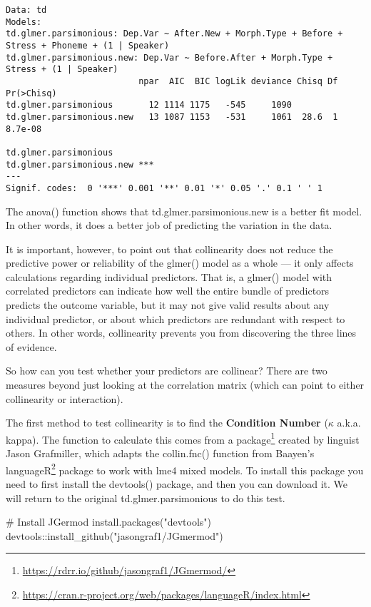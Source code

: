 \documentclass[
  10pt,
  letterpaper]{article}
\newenvironment{Shaded}{\begin{snugshade}}{\end{snugshade}}
\newcommand{\CommentTok}[1]{\textcolor[rgb]{0.37,0.37,0.37}{#1}}
\newcommand{\FunctionTok}[1]{\textcolor[rgb]{0.28,0.35,0.67}{#1}}
\newcommand{\NormalTok}[1]{\textcolor[rgb]{0.00,0.23,0.31}{#1}}
\newcommand{\SpecialCharTok}[1]{\textcolor[rgb]{0.37,0.37,0.37}{#1}}
\newcommand{\StringTok}[1]{\textcolor[rgb]{0.13,0.47,0.30}{#1}}
\renewcommand\texttt[1]{{\ttfamily\color{BrickRed}#1}}
\DeclareRobustCommand{\href}[2]{#2\footnote{\url{#1}}}
\begin{document}
\begin{verbatim}
Data: td
Models:
td.glmer.parsimonious: Dep.Var ~ After.New + Morph.Type + Before + Stress + Phoneme + (1 | Speaker)
td.glmer.parsimonious.new: Dep.Var ~ Before.After + Morph.Type + Stress + (1 | Speaker)
                          npar  AIC  BIC logLik deviance Chisq Df Pr(>Chisq)
td.glmer.parsimonious       12 1114 1175   -545     1090                    
td.glmer.parsimonious.new   13 1087 1153   -531     1061  28.6  1    8.7e-08
                             
td.glmer.parsimonious        
td.glmer.parsimonious.new ***
---
Signif. codes:  0 '***' 0.001 '**' 0.01 '*' 0.05 '.' 0.1 ' ' 1
\end{verbatim}

The \texttt{anova()} function shows that
\texttt{td.glmer.parsimonious.new} is a better fit model. In other
words, it does a better job of predicting the variation in the data.

It is important, however, to point out that collinearity does not reduce
the predictive power or reliability of the \texttt{glmer()} model as a
whole --- it only affects calculations regarding individual predictors.
That is, a \texttt{glmer()} model with correlated predictors can
indicate how well the entire bundle of predictors predicts the outcome
variable, but it may not give valid results about any individual
predictor, or about which predictors are redundant with respect to
others. In other words, collinearity prevents you from discovering the
three lines of evidence.

So how can you test whether your predictors are collinear? There are two
measures beyond just looking at the correlation matrix (which can point
to either collinearity or interaction).

The first method to test collinearity is to find the \textbf{Condition
Number} (\(\kappa\) a.k.a. kappa). The function to calculate this comes
from a \href{https://rdrr.io/github/jasongraf1/JGmermod/}{package}
created by linguist Jason Grafmiller, which adapts the
\texttt{collin.fnc()} function from Baayen's
\href{https://cran.r-project.org/web/packages/languageR/index.html}{\texttt{languageR}}
package to work with \texttt{lme4} mixed models. To install this package
you need to first install the \texttt{devtools()} package, and then you
can download it. We will return to the original
\texttt{td.glmer.parsimonious} to do this test.

\begin{Shaded}
\begin{Highlighting}[]
\CommentTok{\# Install JGermod}
\FunctionTok{install.packages}\NormalTok{(}\StringTok{"devtools"}\NormalTok{)}
\NormalTok{devtools}\SpecialCharTok{::}\FunctionTok{install\_github}\NormalTok{(}\StringTok{"jasongraf1/JGmermod"}\NormalTok{)}
\end{Highlighting}
\end{Shaded}
\end{document}
